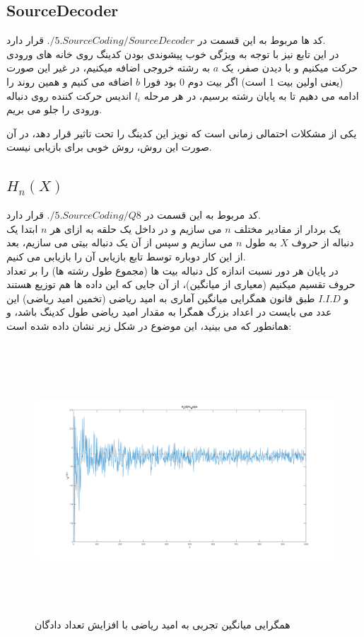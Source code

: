 \documentclass[a4paper,12pt]{article}
\begin{document}
\subsection{SourceDecoder}
کد ها مربوط به این قسمت در $./5.SourceCoding/SourceDecoder$ قرار دارد.
\\
در این تابع نیز با توجه به ویژگی خوب پیشوندی بودن کدینگ روی خانه های ورودی حرکت میکنیم و با دیدن صفر، یک $a$ به رشته خروجی اضافه میکنیم، در غیر این صورت (یعنی اولین بیت  1 است) اگر بیت دوم 0 بود فورا $b$ اضافه می کنیم و همین روند را ادامه می دهیم تا به پایان رشته برسیم، در هر مرحله $l_i$ اندیس حرکت کننده روی دنباله ورودی را جلو می بریم.

یکی از مشکلات احتمالی زمانی است که نویز این کدینگ را تحت تاثیر قرار دهد، در آن صورت این روش، روش خوبی برای بازیابی نیست.
\\
\subsection{$H_n(X)$}
کد مربوط به این قسمت در $./5.SourceCoding/Q8 $ قرار دارد.
\\
یک بردار از مقادیر مختلف $n$ می سازیم و در داخل یک حلقه به ازای هر $n$ ابتدا یک دنباله از حروف $X$ به طول $n$ می سازیم و سپس از آن یک دنباله بیتی می سازیم، بعد از این کار دوباره توسط تابع بازیابی آن را بازیابی می کنیم.
\\
در پایان هر دور نسبت اندازه کل دنباله بیت ها (مجموع طول رشته ها) را بر تعداد حروف تقسیم میکنیم (معیاری از میانگین)، از آن جایی که این داده ها هم توزیع هستند و $I.I.D$ طبق قانون همگرایی میانگین آماری به امید ریاضی (تخمین امید ریاضی) این عدد می بایست در اعداد بزرگ همگرا به مقدار امید ریاضی طول کدینگ باشد، و همانطور که می بینید، این موضوع در شکل زیر نشان داده شده است:
\begin{figure}[htbp]
\centerline{\includegraphics[width=6.625in, height=4in]{../5.SourceCoding/Q8.png}}
\caption{همگرایی میانگین تجربی به امید ریاضی با افزایش تعداد دادگان}
\label{fig}
\end{figure}
\\
\end{document}
